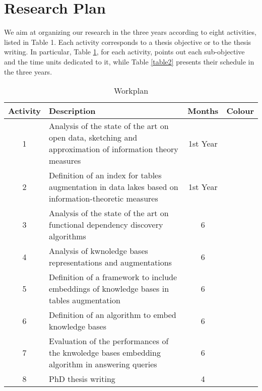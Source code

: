 \section{Research Plan}\label{researchplan}

We aim at organizing our research in the three years according to eight activities, listed in Table 1. Each activity corresponds to a thesis objective or to the thesis writing. In particular, Table \ref{table1}, for each activity, points out each sub-objective and the time units dedicated to it, while Table \ref{table2} presents their schedule in the three years.





\begin{table}[h!]\footnotesize
    \centering
    
    \caption{Workplan\label{table1}}
    \begin{tabular}{|c|p{9cm}|c|c|}
    \hline
    \textbf{Activity} & \textbf{Description} & \textbf{Months} & \textbf{Colour}\\ \hline
    1 & Analysis of the state of the art on open data, sketching and approximation of information theory measures & 1st Year & \cellcolor{lightgreen} \\\hline
    2 & Definition of an index for tables augmentation in data lakes based on information-theoretic measures& 1st Year & \cellcolor{green} \\\hline
    3 & Analysis of the state of the art on functional dependency discovery algorithms& 6 & \cellcolor{lightyellow} \\\hline
    4 & Analysis of kwnoledge bases representations and augmentations& 6 & \cellcolor{orange} \\\hline
    5 & Definition of a framework to include embeddings of knowledge bases in tables augmentation& 6 & \cellcolor{red} \\\hline
    6 & Definition of an algorithm to embed knowledge bases& 6 & \cellcolor{cyan} \\\hline
    7 & Evaluation of the performances of the knwoledge bases embedding algorithm in answering queries& 6 & \cellcolor{blue} \\\hline
    8 & PhD thesis writing& 4 & \cellcolor{blue-violet} \\\hline
    \end{tabular}
    \end{table}
    
